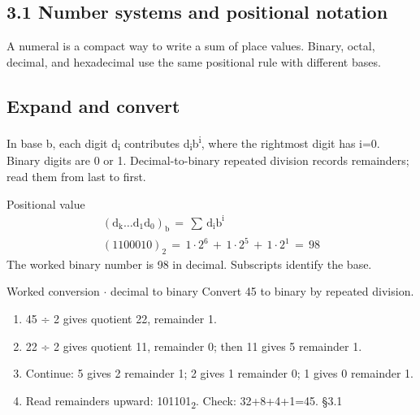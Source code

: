 \documentclass[11pt]{article}
\begin{document}
\begin{keepsection}
\section{3.1 Number systems and positional notation}

A numeral is a compact way to write a sum of place values. Binary, octal, decimal, and hexadecimal use the same positional rule with different bases.

\begin{keepsection}
\subsection{Expand and convert}

In base b, each digit d\textsubscript{i} contributes d\textsubscript{i}b\textsuperscript{i}, where the rightmost digit has i=0. Binary digits are 0 or 1. Decimal-to-binary repeated division records remainders; read them from last to first.

\begin{equationcard}{Positional value}
\[ \begin{gathered} (\mathrm{d}_{\mathrm{k}}…\mathrm{d}_{1}\mathrm{d}_{0})_{\mathrm{b}}\, =\, \sum\, \mathrm{d}_{\mathrm{i}}\mathrm{b}^{\mathrm{i}} \\ (1100010)_{2}\, =\, 1\cdot 2^{6}\, +\, 1\cdot 2^{5}\, +\, 1\cdot 2^{1}\, =\, 98 \end{gathered} \]
{\small The worked binary number is 98 in decimal. Subscripts identify the base.}
\end{equationcard}

\begin{workedbox}{Worked conversion \ensuremath{\cdot} decimal to binary}
Convert 45 to binary by repeated division.

\begin{enumerate}
\item 45 ÷ 2 gives quotient 22, remainder 1.
\item 22 ÷ 2 gives quotient 11, remainder 0; then 11 gives 5 remainder 1.
\item Continue: 5 gives 2 remainder 1; 2 gives 1 remainder 0; 1 gives 0 remainder 1.
\item Read remainders upward: 101101\textsubscript{2}. Check: 32+8+4+1=45. \hfill{\small\color{FAUblue}§3.1}
\end{enumerate}
\end{workedbox}
\end{keepsection}


\end{keepsection}
\end{document}
